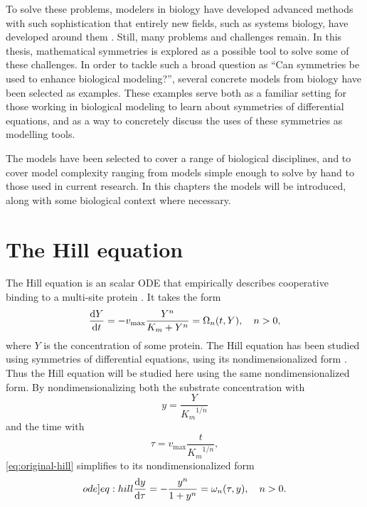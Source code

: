 To solve these problems, modelers in biology have developed advanced methods with such sophistication that entirely new fields, such as systems biology, have developed around them \cite{kitano2002systems,westerhoff2004evolution}.
Still, many problems and challenges remain.
In this thesis, mathematical symmetries is explored as a possible tool to solve some of these challenges.
In order to tackle such a broad question as \enquote{Can symmetries be used to enhance biological modeling?}, several concrete models from biology have been selected as examples.
These examples serve both as a familiar setting for those working in biological modeling to learn about symmetries of differential equations, and as a way to concretely discuss the uses of these symmetries as modelling tools.

The models have been selected to cover a range of biological disciplines, and to cover model complexity ranging from models simple enough to solve by hand to those used in current research.
In this chapters the models will be introduced, along with some biological context where necessary.

\section{The Hill equation}

The Hill equation is an scalar ODE that empirically describes cooperative binding to a multi-site protein \cite{weiss1997hill}.
It takes the form
\begin{equation} \label{eq:original-hill}
  \diff{Y}{t} = - v_\text{max} \frac{Y^n}{K_m + Y^n} = \Omega_n(t, Y), \quad
  n > 0,
\end{equation}
where \(Y\) is the concentration of some protein.
The Hill equation has been studied using symmetries of differential equations, using its nondimensionalized form \cite{ohlsson2020symmetry}.
Thus the Hill equation will be studied here using the same nondimensionalized form.
By nondimensionalizing both the substrate concentration with
\begin{equation*}
  y = \frac{Y}{{K_m}^{1/n}}
\end{equation*}
and the time with
\begin{equation*}
  \tau = v_\text{max} \frac{t}{{K_m}^{1/n}},
\end{equation*}
\cref{eq:original-hill} simplifies to its nondimensionalized form
\begin{equation} \label[ode]{eq:hill}
  \diff{y}{\tau} = - \frac{y^n}{1 + y^n} = \omega_n(\tau, y), \quad
  n > 0.
\end{equation}

